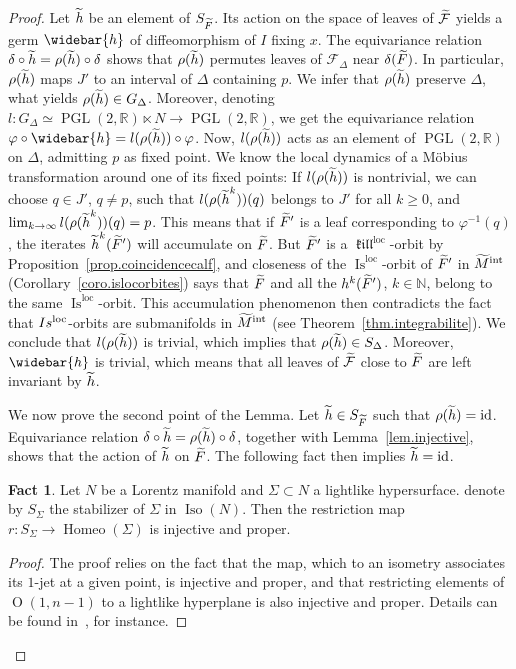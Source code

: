 \documentclass[11pt]{article}
\theoremstyle{definition}
\numberwithin{equation}{section}
\numberwithin{figure}{section}
\numberwithin{table}{section}
\newtheorem{fact}[theo]{Fact} }
\DeclareMathOperator{\Iso}{Iso}
\DeclareMathOperator{\PGL}{PGL}
\DeclareMathOperator{\Omp}{O}%
\DeclareMathOperator{\Is}{Is}
\DeclareMathOperator{\Homeo}{Homeo}
\DeclareMathOperator{\loc}{loc}
\DeclareMathOperator{\id}{id}
\DeclareMathOperator{\intl}{int}
\DeclareMathOperator{\kil}{{\mathfrak{kill}}}
\newcommand{\kiloc}{\kil^{\loc}}
\newcommand{\tm}{\tilde{{M}}}
\newcommand{\tcalf}{\tilde{{\mathcal{F}}}}
\newcommand{\tF}{\tilde{{F}}}
\newcommand{\tth}{\tilde{h}}
\newcommand{\calfd}{{{\mathcal{F}}}_{\Delta}}
\newcommand*\NN{\mathbb{N}}
\newcommand*\RR{\mathbb{R}}
\let\oldtilde\tilde
\renewcommand*\tilde[1]{\mathchoice{\widetilde{#1}}{\widetilde{#1}}{\widetilde{#1}}{\oldtilde{#1}}}
\let\oldbar\bar
\renewcommand*{\bar}[1]{\mathchoice{\widebar{#1}}{\widebar{#1}}{\oldbar{#1}}{\oldbar{#1}}}
\renewcommand*{\overline}{\bar}
\begin{document}
\begin{proof}
Let $\tth$ be an element of $S_{\tF}$. Its action on the space of leaves of $\tcalf$ yields a germ $\overline{h}$ of diffeomorphism of $I$ fixing $x$. The equivariance relation $\delta \circ \tth=\rho(\tth) \circ \delta$ shows that $\rho(\tth)$ permutes leaves of $\calfd$ near $\delta(\tF)$. In particular, $\rho(\tth)$ maps $J'$ to an interval of $\Delta$ containing $p$. We infer that $\rho(\tth)$ preserve $\Delta$, what yields $\rho(\tth) \in G_{\Delta}$. Moreover, denoting $l : G_{\Delta}\simeq \PGL(2,\RR) \ltimes N \to \PGL(2,\RR)$, we get the equivariance relation $\varphi \circ \overline{h}=l(\rho(\tth)) \circ \varphi$. Now, $l(\rho(\tth))$ acts as an element of $\PGL(2,\RR)$ on $\Delta$, admitting $p$ as fixed point. We know the local dynamics of a Möbius transformation around one of its fixed points: If $l(\rho(\tth))$ is nontrivial, we can choose $q \in J'$, $q \not = p$, such that $l(\rho({\tth}^k))(q)$ belongs to $J'$ for all $k \geq 0$, and $\lim_{k \to \infty}l(\rho({\tth}^k))(q)=p$. This means that if $\tF'$ is a leaf corresponding to $\varphi^{-1}(q)$, the iterates ${\tth}^k(\tF')$ will accumulate on $\tF$. But $\tF'$ is a $\kiloc$-orbit by Proposition~\ref{prop.coincidencecalf}, and closeness of the $\Is^{\loc}$-orbit of $\tF'$ in $\tm^{\intl}$ (Corollary~\ref{coro.islocorbites}) says that $\tF$ and all the $h^k(\tF')$, $k \in \NN$, belong to the same $\Is^{\loc}$-orbit. This accumulation phenomenon then contradicts the fact that $\\Is^{\loc}$-orbits are submanifolds in $\tm^{\intl}$ (see Theorem~\ref{thm.integrabilite}). We conclude that $l(\rho(\tth))$ is trivial, which implies that $\rho(\tth) \in S_{\Delta}$. Moreover, $\overline{h}$ is trivial, which means that all leaves of $\tcalf$ close to $\tF$ are left invariant by $\tth$.

We now prove the second point of the Lemma. Let $\tth \in S_{\tF}$ such that $\rho(\tth)=\id$. Equivariance relation $\delta \circ \tth = \rho(\tth) \circ \delta$, together with Lemma~\ref{lem.injective}, shows that the action of $\tth$ on $\tF$. The following fact then implies $\tth=\id$.
\begin{fact}\label{fact.injectiveproper}
Let $N$ be a Lorentz manifold and $\Sigma \subset N$ a lightlike hypersurface. denote by $S_{\Sigma}$ the stabilizer of $\Sigma$ in $\Iso(N)$. Then the restriction map $r: S_{\Sigma}\to \Homeo(\Sigma)$ is injective and proper.
\end{fact}

\begin{proof}
The proof relies on the fact that the map, which to an isometry associates its $1$-jet at a given point, is injective and proper, and that restricting elements of $\Omp(1,n-1)$ to a lightlike hyperplane is also injective and proper. Details can be found in~\cite[Proposition~3.6]{zeghibflot}, for instance.
\end{proof}


\end{proof}
\end{document}
